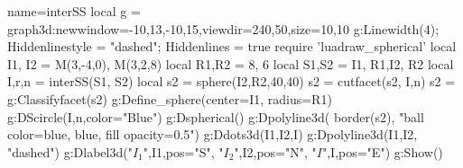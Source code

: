 \documentclass[12pt]{standalone}
\begin{document}
\begin{luadraw}{name=interSS}
local g = graph3d:new{window={-10,13,-10,15},viewdir={240,50},size={10,10}}
 g:Linewidth(4); Hiddenlinestyle = "dashed"; Hiddenlines = true
require 'luadraw_spherical'
local I1, I2 = M(3,-4,0), M(3,2,8)
local R1,R2 = 8, 6
local S1,S2 = {I1, R1},{I2, R2}
local I,r,n = interSS(S1, S2)
local s2 = sphere(I2,R2,40,40)
s2 = cutfacet(s2, {I,n})
s2 = g:Classifyfacet(s2)
g:Define_sphere({center=I1, radius=R1}) 
g:DScircle({I,n},{color="Blue"})
g:Dspherical()
g:Dpolyline3d( border(s2), "ball color=blue, blue, fill opacity=0.5")
g:Ddots3d({I1,I2,I})
g:Dpolyline3d({I1,I2}, "dashed")
g:Dlabel3d("$I_1$",I1,{pos="S"}, "$I_2$",I2,{pos="N"}, "$I$",I,{pos="E"})
g:Show()
\end{luadraw} 
\end{document}
